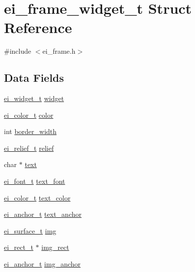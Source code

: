 \hypertarget{structei__frame__widget__t}{
\section{ei\_\-frame\_\-widget\_\-t Struct Reference}
\label{structei__frame__widget__t}
}


{\ttfamily \#include $<$ei\_\-frame.h$>$}\subsection*{Data Fields}
\begin{DoxyCompactItemize}
\item 
\hyperlink{structei__widget__t}{ei\_\-widget\_\-t} \hyperlink{structei__frame__widget__t_a89903d2fb772642f95987d3faf1494e0}{widget}
\item 
\hyperlink{structei__color__t}{ei\_\-color\_\-t} \hyperlink{structei__frame__widget__t_ad5655f5b5eca009feaa3e1cbe3c0e761}{color}
\item 
int \hyperlink{structei__frame__widget__t_a3c9f48c109681702db85b9e02a60cd1a}{border\_\-width}
\item 
\hyperlink{ei__types_8h_aa79a32b1d8ece0e44cfa394e870b270b}{ei\_\-relief\_\-t} \hyperlink{structei__frame__widget__t_a23ba21889e590728603484c0e4728c8e}{relief}
\item 
char $\ast$ \hyperlink{structei__frame__widget__t_affbafa0c71029ba42c4173d665593ccd}{text}
\item 
\hyperlink{ei__types_8h_a22c8198e4d641e4bc67bb17f9c6bcda7}{ei\_\-font\_\-t} \hyperlink{structei__frame__widget__t_a3832154ce5fe1aec4eb4bc372a05158a}{text\_\-font}
\item 
\hyperlink{structei__color__t}{ei\_\-color\_\-t} \hyperlink{structei__frame__widget__t_aecc7c627bf739528388dd0b97fd4ec6c}{text\_\-color}
\item 
\hyperlink{ei__types_8h_a3852c963af609d31d7cfcff79c4c8450}{ei\_\-anchor\_\-t} \hyperlink{structei__frame__widget__t_a47ce58b9e3c67b6567a9b7739e217111}{text\_\-anchor}
\item 
\hyperlink{hw__interface_8h_ad9970ae727c438faaf09c58c5defb796}{ei\_\-surface\_\-t} \hyperlink{structei__frame__widget__t_abd19824f244fc5a498cd9e7df6343a91}{img}
\item 
\hyperlink{structei__rect__t}{ei\_\-rect\_\-t} $\ast$ \hyperlink{structei__frame__widget__t_a0e3772cc22eb4339b9a1c12b0cbd6667}{img\_\-rect}
\item 
\hyperlink{ei__types_8h_a3852c963af609d31d7cfcff79c4c8450}{ei\_\-anchor\_\-t} \hyperlink{structei__frame__widget__t_aaaf211e8637c20e80723009615f625a9}{img\_\-anchor}
\end{DoxyCompactItemize}


